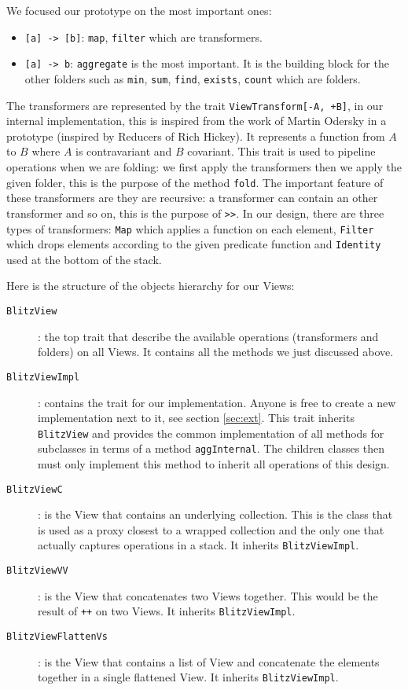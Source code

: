 \documentclass[a4paper,12pt,twocolumn]{article}
\begin{document}
We focused our prototype on the most important ones:
\begin{itemize}
    \item \verb|[a] -> [b]|: \verb|map|, \verb|filter| which are transformers.
    \item \verb|[a] -> b|: \verb|aggregate| is the most important. It is the building block for the other folders such as \verb|min|, \verb|sum|, \verb|find|, \verb|exists|, \verb|count| which are folders.
\end{itemize}

The transformers are represented by the trait \verb|ViewTransform[-A, +B]|, in our internal implementation, this is inspired from the work of Martin Odersky in a prototype \cite{martin-view-prototype} (inspired by Reducers of Rich Hickey\cite{hickey-reducers}). %
It represents a function from $A$ to $B$ where $A$ is contravariant and $B$ covariant.
This trait is used to pipeline operations when we are folding: we first apply the transformers then we apply the given folder, this is the purpose of the method \verb|fold|.
The important feature of these transformers are they are recursive: a transformer can contain an other transformer and so on, this is the purpose of \verb|>>|.
In our design, there are three types of transformers: \verb|Map| which applies a function on each element, \verb|Filter| which drops elements according to the given predicate function and \verb|Identity| used at the bottom of the stack.

Here is the structure of the objects hierarchy for our Views:
\begin{description}
    \item[{\tt BlitzView}]: the top trait that describe the available operations (transformers and folders) on all Views.
        It contains all the methods we just discussed above.
    \item[{\tt BlitzViewImpl}]: contains the trait for our implementation.
        Anyone is free to create a new implementation next to it, see section \ref{sec:ext}.
        This trait inherits \verb|BlitzView| and provides the common implementation of all methods for subclasses in terms of a method \verb|aggInternal|.
        The children classes then must only implement this method to inherit all operations of this design.
    \item[{\tt BlitzViewC}]: is the View that contains an underlying collection.
        This is the class that is used as a proxy closest to a wrapped collection and the only one that actually captures operations in a stack.
        It inherits \verb|BlitzViewImpl|.
    \item[{\tt BlitzViewVV}]: is the View that concatenates two Views together.
        This would be the result of \verb|++| on two Views.
        It inherits \verb|BlitzViewImpl|.
    \item[{\tt BlitzViewFlattenVs}]: is the View that contains a list of View and concatenate the elements together in a single flattened View.
        It inherits \verb|BlitzViewImpl|.
\end{description}
\end{document}
